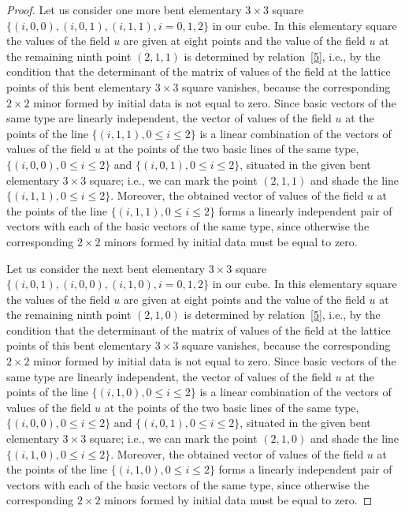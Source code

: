 \documentclass[pdftex]{sigma}
\begin{document}
\begin{proof}
Let us consider one more bent elementary $3 \times 3$ square $\{(i,
0, 0), (i, 0, 1), (i, 1, 1), i = 0, 1, 2\}$ in our cube. In this
elementary square the values of the f\/ield $u$ are given at eight
points and the value of the f\/ield $u$ at the remaining ninth point
$(2, 1, 1)$ is determined by relation~\eqref{5}, i.e., by the
condition that the determinant of the matrix of values of the f\/ield
at the lattice points of this bent elementary $3 \times 3$ square
vanishes, because the corresponding $2 \times 2$ minor formed by
initial data is not equal to zero. Since basic vectors of the same
type are linearly independent, the vector of values of the f\/ield $u$
at the points of the line $\{(i, 1, 1), 0 \leq i \leq 2\}$ is a
linear combination of the vectors of values of the f\/ield $u$ at the
points of the two basic lines of the same type, $\{(i, 0, 0), 0 \leq
i \leq 2\}$ and $\{(i, 0, 1), 0 \leq i \leq 2\}$, situated in the
given bent elementary $3 \times 3$ square; i.e., we can mark the
point $(2, 1, 1)$ and shade the line $\{(i, 1, 1), 0 \leq i \leq
2\}$. Moreover, the obtained vector of values of the f\/ield $u$ at
the points of the line $\{(i, 1, 1), 0 \leq i \leq 2\}$ forms a
linearly independent pair of vectors with each of the basic vectors
of the same type, since otherwise the corresponding $2 \times 2$
minors formed by initial data must be equal to zero.



Let us consider the next bent elementary $3 \times 3$ square $\{(i,
0, 1), (i, 0, 0), (i, 1, 0),  i = 0, 1, 2\}$ in our cube. In this
elementary square the values of the f\/ield $u$ are given at eight
points and the value of the f\/ield $u$ at the remaining ninth point
$(2, 1, 0)$ is determined by relation~\eqref{5}, i.e., by the
condition that the determinant of the matrix of values of the f\/ield
at the lattice points of this bent elementary $3 \times 3$ square
vanishes, because the corresponding $2 \times 2$ minor formed by
initial data is not equal to zero. Since basic vectors of the same
type are linearly independent, the vector of values of the f\/ield $u$
at the points of the line $\{(i, 1, 0), 0 \leq i \leq 2\}$ is a
linear combination of the vectors of values of the f\/ield $u$ at the
points of the two basic lines of the same type, $\{(i, 0, 0), 0 \leq
i \leq 2\}$ and $\{(i, 0, 1), 0 \leq i \leq 2\}$, situated in the
given bent elementary $3 \times 3$ square; i.e., we can mark the
point $(2, 1, 0)$ and shade the line $\{(i, 1, 0), 0 \leq i \leq
2\}$. Moreover, the obtained vector of values of the f\/ield $u$ at
the points of the line $\{(i, 1, 0), 0 \leq i \leq 2\}$ forms a
linearly independent pair of vectors with each of the basic vectors
of the same type, since otherwise the corresponding $2 \times 2$
minors formed by initial data must be equal to zero.





\end{proof}
\end{document}
